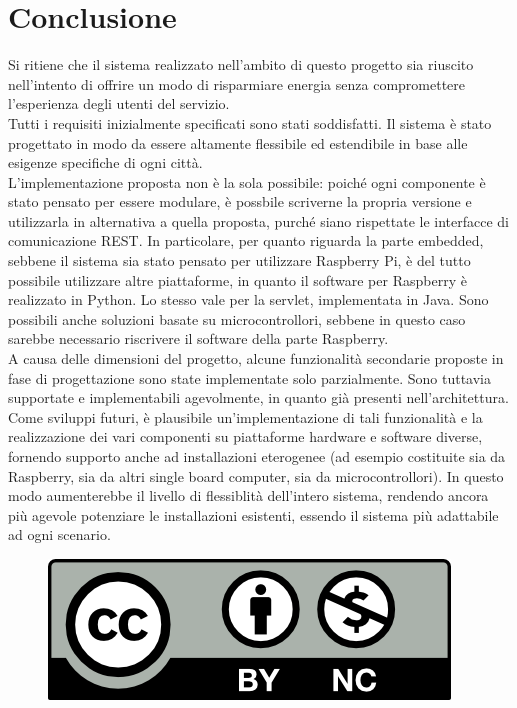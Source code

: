 \chapter{Conclusione} 

Si ritiene che il sistema realizzato nell'ambito di questo progetto sia riuscito nell'intento di offrire un modo di risparmiare energia senza compromettere l'esperienza degli utenti del servizio.
\\Tutti i requisiti inizialmente specificati sono stati soddisfatti. Il sistema è stato progettato in modo da essere altamente flessibile ed estendibile in base alle esigenze specifiche di ogni città.
\\L'implementazione proposta non è la sola possibile: poiché ogni componente è stato pensato per essere modulare, è possbile scriverne la propria versione e utilizzarla in alternativa a quella proposta, purché siano rispettate le interfacce di comunicazione REST.
In particolare, per quanto riguarda la parte embedded, sebbene il sistema sia stato pensato per utilizzare Raspberry Pi, è del tutto possibile utilizzare altre piattaforme, in quanto il software per Raspberry è realizzato in Python. Lo stesso vale per la servlet, implementata in Java.
Sono possibili anche soluzioni basate su microcontrollori, sebbene in questo caso sarebbe necessario riscrivere il software della parte Raspberry.
\\A causa delle dimensioni del progetto, alcune funzionalità secondarie proposte in fase di progettazione sono state implementate solo parzialmente. Sono tuttavia supportate e implementabili agevolmente, in quanto già presenti nell'architettura.
\\Come sviluppi futuri, è plausibile un'implementazione di tali funzionalità e la realizzazione dei vari componenti su piattaforme hardware e software diverse, fornendo supporto anche ad installazioni eterogenee (ad esempio costituite sia da Raspberry, sia da altri single board computer, sia da microcontrollori).
In questo modo aumenterebbe il livello di flessiblità dell'intero sistema, rendendo ancora più agevole potenziare le installazioni esistenti, essendo il sistema più adattabile ad ogni scenario.
\begin{figure}[b]
	\centering
	\includegraphics[scale=1.0]{figure/cc-by-nc.png}
\end{figure}
